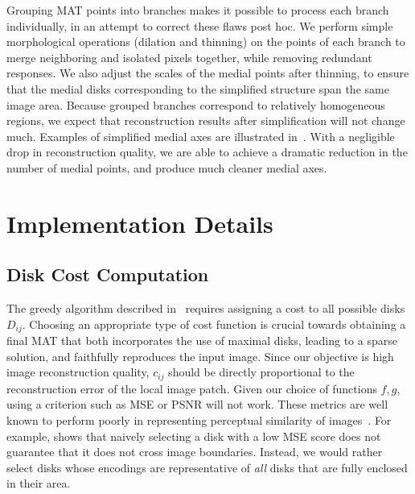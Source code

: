 \documentclass[10pt,twocolumn,letterpaper]{article}
\begin{document}
Grouping MAT points into branches makes it possible to process each branch individually, in an attempt
to correct these flaws post hoc.
We perform simple morphological operations (dilation and thinning) 
on the points of each branch to merge neighboring and isolated pixels together, while removing 
redundant responses. 
We also adjust the scales of the medial points after thinning, to ensure that the medial disks corresponding 
to the simplified structure span the same image area.
Because grouped branches correspond to relatively homogeneous regions, we expect that reconstruction
results after simplification will not change much.
Examples of simplified medial axes are illustrated in~.
With a negligible drop in reconstruction quality, we are able to achieve a dramatic reduction
in the number of medial points, and produce much cleaner medial axes.


\section{Implementation Details}\label{sec:method:implementation}
\subsection{Disk Cost Computation}\label{sec:method:diskcost}
The greedy algorithm described in~ requires assigning a cost to all possible disks $D_{ij}$.
Choosing an appropriate type of cost function is crucial towards obtaining a final MAT that both incorporates
the use of maximal disks, leading to a sparse solution, and faithfully reproduces the input image.
Since our objective is high image reconstruction quality, $c_{ij}$ should be directly proportional
to the reconstruction error of the local image patch.
Given our choice of functions $f,g$, using a criterion such as MSE or PSNR will not work.
These metrics are well known to perform poorly in representing perceptual similarity of images~\cite{girod1993what,wang2009mean}.
For example,  shows that naively selecting a disk with a low MSE score does not guarantee that it 
does not cross image boundaries.
Instead, we would rather select disks whose encodings are representative of \emph{all} disks that are fully enclosed
in their area. 
\end{document}
